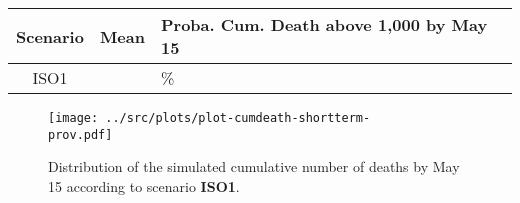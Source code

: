 \documentclass[10pt]{article}
\newcommand{\scen}[1]{\textbf{\textsf{#1}}}
\begin{document}
\renewcommand{\arraystretch}{1.2}
\begin{table}[h!]
\begin{center}
\begin{tabular}{c r C{44mm}}
\hline
\bf Scenario & \bf Mean & \bf Proba. Cum. Death above 1,000 by May 15  \\
\hline


\sf ISO1 & 
&
\% \\


\hline
\end{tabular}
\label{tab:cumdeathShort}
\end{center}
\end{table}




\begin{figure}[h!]
\begin{center}
\texttt{[image: ../src/plots/plot-cumdeath-shortterm-\\prov.pdf]}
\caption{Distribution of the simulated cumulative number of deaths by May 15 according to scenario \scen{ISO1}.}
\label{fig:cumdeathShort}
\end{center}
\end{figure}
\end{document}
